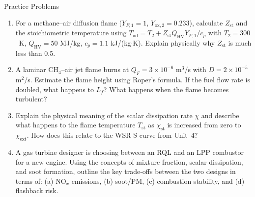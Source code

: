 \documentclass[12pt,aspectratio=169]{beamer}
\newcommand{\Zst}{Z_{\text{st}}}
\newcommand{\Tad}{T_{\text{ad}}}
\newcommand{\Lf}{L_f}
\begin{document}
\appendix
\begin{frame}{Practice Problems}
  \begin{enumerate}
    \item For a methane--air diffusion flame ($Y_{F,1}=1$,
          $Y_{\text{ox},2}=0.233$), calculate $\Zst$ and the
          stoichiometric temperature using $\Tad = T_2
          + \Zst Q_{\text{HV}} Y_{F,1}/c_p$
          with $T_2 = 300$~K, $Q_{\text{HV}} = 50$ MJ/kg,
          $c_p = 1.1$ kJ/(kg$\cdot$K).
          Explain physically why $\Zst$ is much less than 0.5.

    \item A laminar CH$_4$--air jet flame burns at $Q_F =
          3\times10^{-6}$ m$^3$/s with $D = 2\times10^{-5}$ m$^2$/s.
          Estimate the flame height using Roper's formula.
          If the fuel flow rate is doubled, what happens to $\Lf$?
          What happens when the flame becomes turbulent?

    \item Explain the physical meaning of the scalar dissipation
          rate $\chi$ and describe what happens to the flame temperature
          $T_{\text{st}}$ as $\chi_{\text{st}}$ is increased from
          zero to $\chi_{\text{ext}}$.
          How does this relate to the WSR S-curve from Unit~4?

    \item A gas turbine designer is choosing between an RQL and an LPP
          combustor for a new engine.
          Using the concepts of mixture fraction, scalar dissipation,
          and soot formation, outline the key trade-offs between the
          two designs in terms of: (a) NO$_x$ emissions, (b) soot/PM,
          (c) combustion stability, and (d) flashback risk.
  \end{enumerate}
\end{frame}
\end{document}
